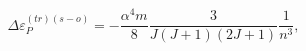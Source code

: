 \begin{equation}
\Delta \varepsilon _{P}^{\left( tr\right) \left( s-o\right) }=-\frac{\alpha
^{4}m}{8}\frac{3}{J(J+1)\left( 2J+1\right) }\frac{1}{n^{3}},
\end{equation}

